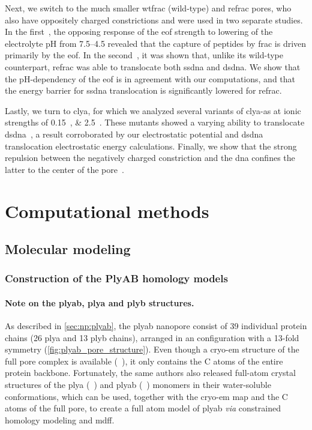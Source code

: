 Next, we switch to the much smaller \gls{wtfrac} (wild-type) and \gls{refrac} pores, who also have oppositely
charged constrictions and were used in two separate studies. In the first~\cite{Huang-2017}, the opposing
response of the \gls{eof} strength to lowering of the electrolyte pH from \numrange{7.5}{4.5} revealed that
the capture of peptides by \gls{frac} is driven primarily by the \gls{eof}. In the second~\cite{Wloka-2016},
it was shown that, unlike its wild-type counterpart, \gls{refrac} was able to translocate both \gls{ssdna} and
\gls{dsdna}. We show that the pH-dependency of the \gls{eof} is in agreement with our computations, and that
the energy barrier for \gls{ssdna} translocation is significantly lowered for \gls{refrac}.

Lastly, we turn to \gls{clya}, for which we analyzed several variants of \gls{clya-as} at ionic strengths of
\SIlist{0.15;2.5}{\Molar}. These mutants showed a varying ability to translocate
\gls{dsdna}~\cite{Franceschini-2016}, a result corroborated by our electrostatic potential and \gls{dsdna}
translocation electrostatic energy calculations. Finally, we show that the strong repulsion between the
negatively charged constriction and the \gls{dna} confines the latter to the center of the
pore~\cite{Bayoumi-2020}.

%
%
\clearpage
%
%


%
%
\section{Computational methods}
%
\label{sec:elec:methods}
%

\subsection{Molecular modeling}
%
\label{sec:elec:methods:molec}

\subsubsection{Construction of the PlyAB homology models}
%

\paragraph{Note on the \gls{plyab}, \gls{plya} and \gls{plyb} structures.}
%
As described in \cref{sec:np:plyab}, the \Gls{plyab} nanopore consist of 39 individual protein chains (26
\gls{plya} and 13 \gls{plyb} chains), arranged in an  configuration with a 13-fold symmetry
(\cref{fig:plyab_pore_structure}). Even though a \gls{cryo-em} structure of the full pore complex is available
(~\cite{Lukoyanova-Kondos-2015}), it only contains the C\ta{} atoms of the entire protein
backbone. Fortunately, the same authors also released full-atom crystal structures of the \gls{plya}
(~\cite{Lukoyanova-Kondos-2015}) and \gls{plyab} (~\cite{Lukoyanova-Kondos-2015})
monomers in their water-soluble conformations, which can be used, together with the \gls{cryo-em} map and the
C\ta{} atoms of the full pore, to create a full atom model of \gls{plyab} \textit{via} constrained homology
modeling and \gls{mdff}.

